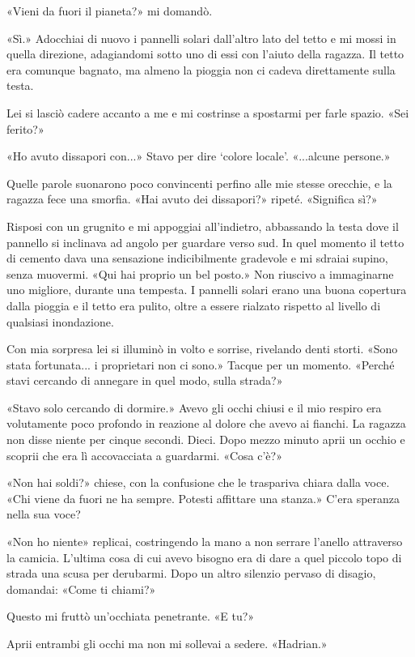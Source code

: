 «Vieni da fuori il pianeta?» mi domandò.

«Sì.» Adocchiai di nuovo i pannelli solari dall'altro lato del tetto e
mi mossi in quella direzione, adagiandomi sotto uno di essi con l'aiuto
della ragazza. Il tetto era comunque bagnato, ma almeno la pioggia non
ci cadeva direttamente sulla testa.

Lei si lasciò cadere accanto a me e mi costrinse a spostarmi per farle
spazio. «Sei ferito?»

«Ho avuto dissapori con...» Stavo per dire `colore locale'. «...alcune
persone.»

Quelle parole suonarono poco convincenti perfino alle mie stesse
orecchie, e la ragazza fece una smorfia. «Hai avuto dei dissapori?»
ripeté. «Significa sì?»

Risposi con un grugnito e mi appoggiai all'indietro, abbassando la testa
dove il pannello si inclinava ad angolo per guardare verso sud. In quel
momento il tetto di cemento dava una sensazione indicibilmente gradevole
e mi sdraiai supino, senza muovermi. «Qui hai proprio un bel posto.» Non
riuscivo a immaginarne uno migliore, durante una tempesta. I pannelli
solari erano una buona copertura dalla pioggia e il tetto era pulito,
oltre a essere rialzato rispetto al livello di qualsiasi inondazione.

Con mia sorpresa lei si illuminò in volto e sorrise, rivelando denti
storti. «Sono stata fortunata... i proprietari non ci sono.» Tacque per
un momento. «Perché stavi cercando di annegare in quel modo, sulla
strada?»

«Stavo solo cercando di dormire.» Avevo gli occhi chiusi e il mio
respiro era volutamente poco profondo in reazione al dolore che avevo ai
fianchi. La ragazza non disse niente per cinque secondi. Dieci. Dopo
mezzo minuto aprii un occhio e scoprii che era lì accovacciata a
guardarmi. «Cosa c'è?»

«Non hai soldi?» chiese, con la confusione che le traspariva chiara
dalla voce. «Chi viene da fuori ne ha sempre. Potesti affittare una
stanza.» C'era speranza nella sua voce?

«Non ho niente» replicai, costringendo la mano a non serrare l'anello
attraverso la camicia. L'ultima cosa di cui avevo bisogno era di dare a
quel piccolo topo di strada una scusa per derubarmi. Dopo un altro
silenzio pervaso di disagio, domandai: «Come ti chiami?»

Questo mi fruttò un'occhiata penetrante. «E tu?»

Aprii entrambi gli occhi ma non mi sollevai a sedere. «Hadrian.»


